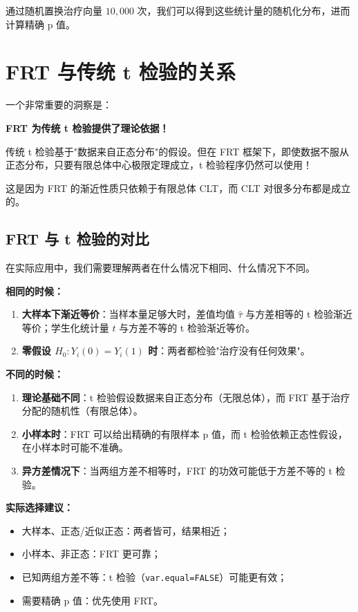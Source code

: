 通过随机置换治疗向量 $10{,}000$ 次，我们可以得到这些统计量的随机化分布，进而计算精确 p 值。

\section{FRT 与传统 t 检验的关系}

一个非常重要的洞察是：

\begin{center}
\textbf{FRT 为传统 t 检验提供了理论依据！}
\end{center}

传统 t 检验基于"数据来自正态分布"的假设。但在 FRT 框架下，即使数据不服从正态分布，只要有限总体中心极限定理成立，t 检验程序仍然可以使用！

这是因为 FRT 的渐近性质只依赖于有限总体 CLT，而 CLT 对很多分布都是成立的。


\subsection{FRT 与 t 检验的对比}

在实际应用中，我们需要理解两者在什么情况下相同、什么情况下不同。

\textbf{相同的时候：}
\begin{enumerate}
  \item \textbf{大样本下渐近等价}：当样本量足够大时，差值均值 $\hat{\tau}$ 与方差相等的 t 检验渐近等价；学生化统计量 $t$ 与方差不等的 t 检验渐近等价。
  \item \textbf{零假设 $H_0: Y_i(0) = Y_i(1)$ 时}：两者都检验"治疗没有任何效果"。
\end{enumerate}

\textbf{不同的时候：}
\begin{enumerate}
  \item \textbf{理论基础不同}：t 检验假设数据来自正态分布（无限总体），而 FRT 基于治疗分配的随机性（有限总体）。
  \item \textbf{小样本时}：FRT 可以给出精确的有限样本 p 值，而 t 检验依赖正态性假设，在小样本时可能不准确。
  \item \textbf{异方差情况下}：当两组方差不相等时，FRT 的功效可能低于方差不等的 t 检验。
\end{enumerate}

\textbf{实际选择建议：}
\begin{itemize}
  \item 大样本、正态/近似正态：两者皆可，结果相近；
  \item 小样本、非正态：FRT 更可靠；
  \item 已知两组方差不等：t 检验（\texttt{var.equal=FALSE}）可能更有效；
  \item 需要精确 p 值：优先使用 FRT。
\end{itemize}

